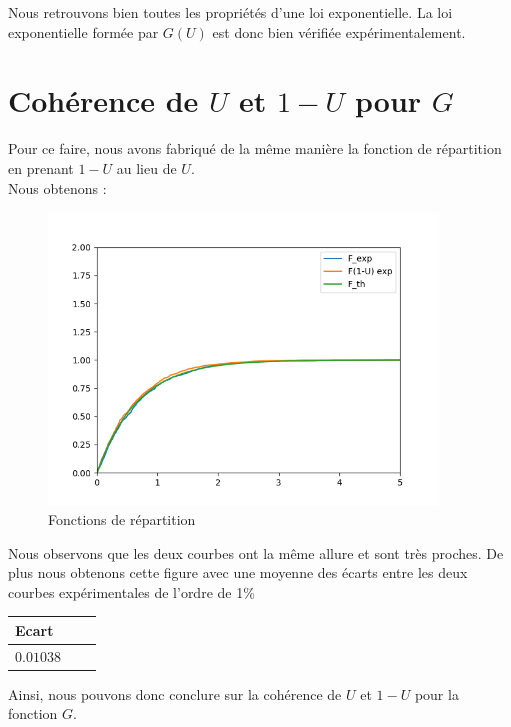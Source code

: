 \documentclass[12,french]{report}
\begin{document}
Nous retrouvons bien toutes les propriétés d'une loi exponentielle. La loi exponentielle formée par $G(U)$ est donc bien vérifiée expérimentalement.\\

\section{Cohérence de $U$ et $1-U$ pour $G$}

Pour ce faire, nous avons fabriqué de la même manière la fonction de répartition en prenant $1-U$ au lieu de $U$.\\

Nous obtenons :

\begin{figure}[H]
	\center
	\includegraphics[width=0.92215\textwidth]{./Images/EcartU}
	\caption{Fonctions de répartition}
\end{figure}\vspace{0.2cm}

Nous observons que les deux courbes ont la même allure et sont très proches. De plus nous obtenons cette figure avec une moyenne des écarts entre les deux courbes expérimentales de l'ordre de 1\%

\begin{center}
\begin{tabular}{|l|c|r|}
				\hline
			    Ecart \\
    			\hline
   				$0.01038$\\
   				\hline
   				\end{tabular}
\end{center}

Ainsi, nous pouvons donc conclure sur la cohérence de $U$ et $1-U$ pour la fonction $G$.
\end{document}
